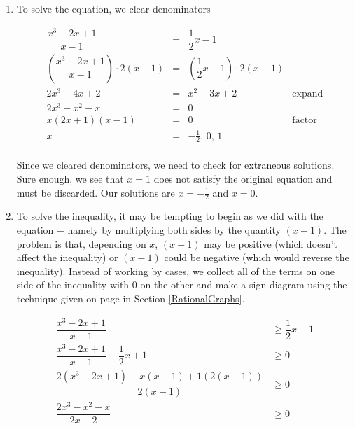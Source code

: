 {
\begin{enumerate}

\item  To solve the equation, we clear denominators

\[ \begin{array}{rclr}

\dfrac{x^3-2x+1}{x-1} & = & \dfrac{1}{2}x-1 & \\ [10pt]

\left(\dfrac{x^3-2x+1}{x-1}\right) \cdot 2(x-1) & = & \left( \dfrac{1}{2}x-1 \right) \cdot 2(x-1) & \\ [10pt]

2x^3 - 4x + 2 & = & x^2-3x+2 & \mbox{expand} \\

2x^3 -x^2 - x & = & 0 & \\

x(2x+1)(x-1) & = & 0 & \mbox{factor}\\

x & = & -\frac{1}{2}, \, 0, \, 1 & \\


\end{array}\]

Since we cleared denominators, we need to check for extraneous solutions.  Sure enough, we see that $x=1$ does not satisfy the original equation and must be discarded.  Our solutions are $x=-\frac{1}{2}$ and $x=0$.

\item  To solve the inequality, it may be tempting to begin as we did with the equation $-$ namely by multiplying both sides by the quantity $(x-1)$.  The problem is that, depending on $x$, $(x-1)$ may be positive (which doesn't affect the inequality) or $(x-1)$ could be negative (which would reverse the inequality).  Instead of working by cases, we collect all of the terms on one side of the inequality with $0$ on the other and make a sign diagram using the technique given on page \pageref{rationalsigndiagram} in Section \ref{RationalGraphs}.

\begin{align*}
\dfrac{x^3-2x+1}{x-1} & \geq \dfrac{1}{2}x-1  \\ 
\dfrac{x^3-2x+1}{x-1}  - \dfrac{1}{2} x + 1& \geq  0 \\
\dfrac{2\left(x^3-2x+1\right)-x(x-1)+1(2(x-1))}{2(x-1)} & \geq  0  \tag*{get a common denominator} \\ 
\dfrac{2x^3-x^2-x}{2x-2} & \geq  0  \tag*{expand}
\end{align*}


\end{enumerate}}
